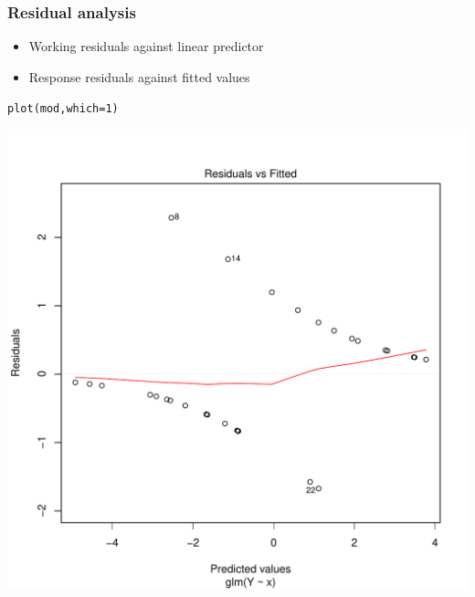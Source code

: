 \documentclass[extsize,handout,10pt]{beamer}\usepackage[]{graphicx}\usepackage[]{color}
\makeatletter
\newcommand{\hlnum}[1]{\textcolor[rgb]{0.502,0.086,1}{#1}}%
\newcommand{\hlstd}[1]{\textcolor[rgb]{0.251,0.251,0.251}{#1}}%
\newcommand{\hlkwc}[1]{\textcolor[rgb]{0.188,0.941,0.314}{#1}}%
\newcommand{\hlkwd}[1]{\textcolor[rgb]{0.69,0.188,0.941}{#1}}%
\newenvironment{kframe}{%
 \def\at@end@of@kframe{}%
 \ifinner\ifhmode%
  \def\at@end@of@kframe{\end{minipage}}%
  \begin{minipage}{\columnwidth}%
 \fi\fi%
 \def\FrameCommand##1{\hskip\@totalleftmargin \hskip-\fboxsep
 \colorbox{shadecolor}{##1}\hskip-\fboxsep
     \hskip-\linewidth \hskip-\@totalleftmargin \hskip\columnwidth}%
 \MakeFramed {\advance\hsize-\width
   \@totalleftmargin\z@ \linewidth\hsize
   \@setminipage}}%
 {\par\unskip\endMakeFramed%
 \at@end@of@kframe}
\newenvironment{knitrout}{}{} %
\makeatother
\begin{document}
\begin{frame}[fragile]
  \frametitle{Residual analysis} 

  \begin{itemize}
  \item Working residuals against linear predictor
  \item Response residuals against fitted values
  \end{itemize}

\begin{knitrout}\tiny
{}\color{fgcolor}\begin{kframe}
\begin{alltt}
\hlkwd{plot}\hlstd{(mod,}\hlkwc{which}\hlstd{=}\hlnum{1}\hlstd{)}
\end{alltt}
\end{kframe}

{\centering \includegraphics[width=.49\linewidth]{figures/GesWiss2unnamed-chunk-12-1} 

}



\end{knitrout}
 

\end{frame}
\end{document}
